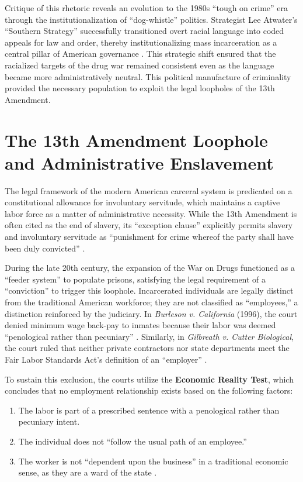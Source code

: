 \documentclass[12pt,openany]{book}
\begin{document}
Critique of this rhetoric reveals an evolution to the 1980s ``tough on crime'' era through the institutionalization of ``dog-whistle'' politics. Strategist Lee Atwater's ``Southern Strategy'' successfully transitioned overt racial language into coded appeals for law and order, thereby institutionalizing mass incarceration as a central pillar of American governance \cite{vera_institute}. This strategic shift ensured that the racialized targets of the drug war remained consistent even as the language became more administratively neutral. This political manufacture of criminality provided the necessary population to exploit the legal loopholes of the 13th Amendment.

\section{The 13th Amendment Loophole and Administrative Enslavement}

The legal framework of the modern American carceral system is predicated on a constitutional allowance for involuntary servitude, which maintains a captive labor force as a matter of administrative necessity. While the 13th Amendment is often cited as the end of slavery, its ``exception clause'' explicitly permits slavery and involuntary servitude as ``punishment for crime whereof the party shall have been duly convicted'' \cite{princeton_legal}.

During the late 20th century, the expansion of the War on Drugs functioned as a ``feeder system'' to populate prisons, satisfying the legal requirement of a ``conviction'' to trigger this loophole. Incarcerated individuals are legally distinct from the traditional American workforce; they are not classified as ``employees,'' a distinction reinforced by the judiciary. In \textit{Burleson v. California} (1996), the court denied minimum wage back-pay to inmates because their labor was deemed ``penological rather than pecuniary'' \cite{princeton_legal}. Similarly, in \textit{Gilbreath v. Cutter Biological}, the court ruled that neither private contractors nor state departments meet the Fair Labor Standards Act's definition of an ``employer'' \cite{princeton_legal}.

To sustain this exclusion, the courts utilize the \textbf{Economic Reality Test}, which concludes that no employment relationship exists based on the following factors:
\begin{enumerate}
    \item The labor is part of a prescribed sentence with a penological rather than pecuniary intent.
    \item The individual does not ``follow the usual path of an employee.''
    \item The worker is not ``dependent upon the business'' in a traditional economic sense, as they are a ward of the state \cite{princeton_legal}.
\end{enumerate}
\end{document}
